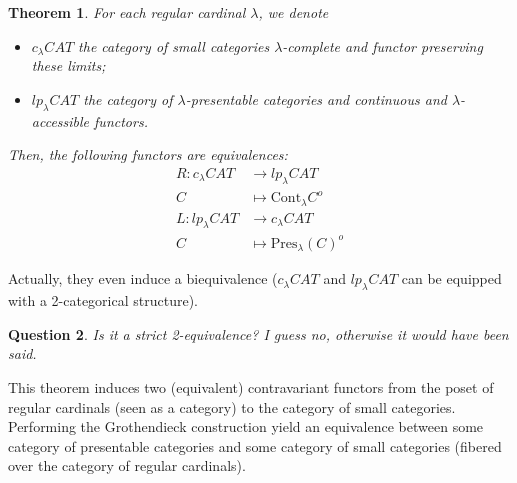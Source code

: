 \documentclass{article}
\newcommand{\Cont}[1]{\text{Cont}_{#1}}
\newcommand{\Pres}[1]{\text{Pres}_{#1}}
\newtheorem{theorem}{Theorem}[section]
\newtheorem{question}[theorem]{Question}
\begin{document}
\begin{theorem}
  For each regular cardinal $\lambda$, we denote
  \begin{itemize}
  \item 
  $c_{\lambda}CAT$ the category of
small categories $\lambda$-complete and functor preserving these limits;
\item $lp_{\lambda}CAT$ the category of $\lambda$-presentable categories and
  continuous and $\lambda$-accessible functors.
  \end{itemize}
Then, the following functors are equivalences:
\begin{align*}
 R : c_{\lambda}CAT & \rightarrow lp_{\lambda}CAT
  \\
  C & \mapsto \Cont\lambda C^o
      \\
 L : lp_{\lambda}CAT& \rightarrow c_{\lambda}CAT 
  \\
  C & \mapsto \Pres\lambda(C)^o
\end{align*}
\end{theorem}
Actually, they even induce a biequivalence ($c_{\lambda}CAT$ and
$lp_{\lambda}CAT$ can be equipped with a 2-categorical structure).
\begin{question}
 Is it a strict 2-equivalence? I guess no, otherwise it would have been said. 
\end{question}

This theorem induces two (equivalent) contravariant functors
from the poset of regular cardinals (seen
as a category) to the category of small categories. Performing the Grothendieck construction yield
an equivalence between some category of presentable categories and some category
of small categories (fibered over the
category of regular cardinals).
\end{document}
